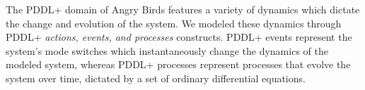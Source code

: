 \documentclass[letterpaper]{article} %
\begin{document}
The PDDL+ domain of Angry Birds features a variety of dynamics which dictate the change and evolution of the system.
We modeled these dynamics through PDDL+ \emph{actions, events, and processes} constructs.
PDDL+ events represent the system's mode switches which instantaneously change the dynamics of the modeled system, whereas PDDL+ processes represent processes that evolve the system over time, dictated by a set of ordinary differential equations.



\end{document}
